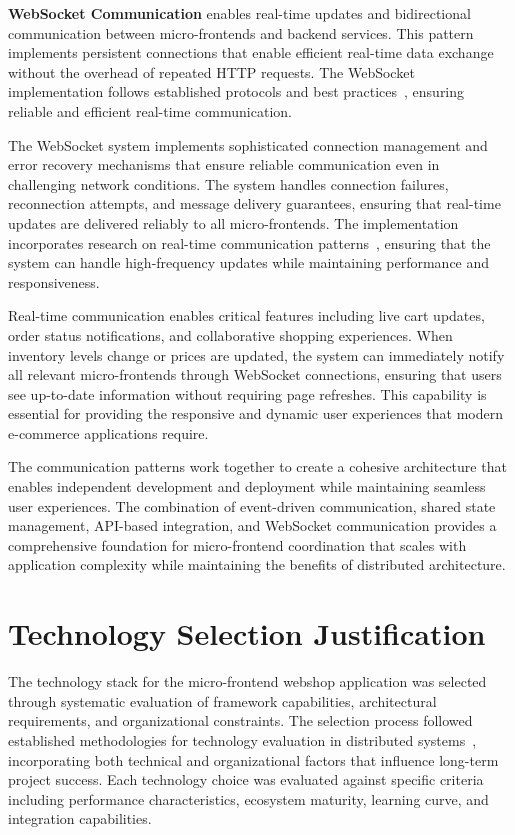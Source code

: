 \documentclass[12pt,a4paper]{report}
\begin{document}
\textbf{WebSocket Communication} enables real-time updates and bidirectional communication between micro-frontends and backend services. This pattern implements persistent connections that enable efficient real-time data exchange without the overhead of repeated HTTP requests. The WebSocket implementation follows established protocols and best practices~\cite{fette2011websocket}, ensuring reliable and efficient real-time communication.

The WebSocket system implements sophisticated connection management and error recovery mechanisms that ensure reliable communication even in challenging network conditions. The system handles connection failures, reconnection attempts, and message delivery guarantees, ensuring that real-time updates are delivered reliably to all micro-frontends. The implementation incorporates research on real-time communication patterns~\cite{allen2010real}, ensuring that the system can handle high-frequency updates while maintaining performance and responsiveness.

Real-time communication enables critical features including live cart updates, order status notifications, and collaborative shopping experiences. When inventory levels change or prices are updated, the system can immediately notify all relevant micro-frontends through WebSocket connections, ensuring that users see up-to-date information without requiring page refreshes. This capability is essential for providing the responsive and dynamic user experiences that modern e-commerce applications require.

The communication patterns work together to create a cohesive architecture that enables independent development and deployment while maintaining seamless user experiences. The combination of event-driven communication, shared state management, API-based integration, and WebSocket communication provides a comprehensive foundation for micro-frontend coordination that scales with application complexity while maintaining the benefits of distributed architecture.

\section{Technology Selection Justification}

The technology stack for the micro-frontend webshop application was selected through systematic evaluation of framework capabilities, architectural requirements, and organizational constraints. The selection process followed established methodologies for technology evaluation in distributed systems~\cite{clements2010documenting}, incorporating both technical and organizational factors that influence long-term project success. Each technology choice was evaluated against specific criteria including performance characteristics, ecosystem maturity, learning curve, and integration capabilities.
\end{document}

